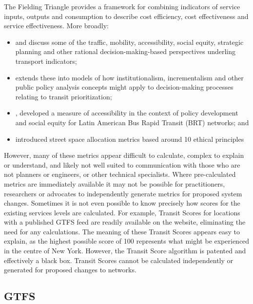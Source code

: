\documentclass[preprint, 3p,
authoryear]{elsarticle} %
\begin{document}
The Fielding Triangle \citep{FieldingGordonJ1987Mpts} provides a
framework for combining indicators of service inputs, outputs and
consumption to describe cost efficiency, cost effectiveness and service
effectiveness. More broadly:

\begin{itemize}
\item
  \citet{Litman:2003ab} and \citet{Litman:2016aa} discuss some of the
  traffic, mobility, accessibility, social equity, strategic planning
  and other rational decision-making-based perspectives underling
  transport indicators;
\item
  \citet{Reynolds:2017ah} extends these into models of how
  institutionalism, incrementalism and other public policy analysis
  concepts might apply to decision-making processes relating to transit
  prioritization;
\item
  \citet{GuzmanLuisA.2017Aeit}, developed a measure of accessibility in
  the context of policy development and social equity for Latin American
  Bus Rapid Transit (BRT) networks; and
\item
  \citet{Creutzig2020streetspaceallocation} introduced street space
  allocation metrics based around 10 ethical principles
\end{itemize}

However, many of these metrics appear difficult to calculate, complex to
explain or understand, and likely not well suited to communication with
those who are not planners or engineers, or other technical specialists.
Where pre-calculated metrics are immediately available it may not be
possible for practitioners, researchers or advocates to independently
generate metrics for proposed system changes. Sometimes it is not even
possible to know precisely how scores for the existing services levels
are calculated. For example, Transit Scores for locations with a
published GTFS feed are readily available on the
\citet{WalkScore:2023tg} website, eliminating the need for any
calculations. The meaning of these Transit Scores appears easy to
explain, as the highest possible score of 100 represents what might be
experienced in the centre of New York. However, the Transit Score
algorithm is patented and effectively a black box. Transit Scores cannot
be calculated independently or generated for proposed changes to
networks.

\hypertarget{gtfs}{%
\subsection{GTFS}\label{gtfs}}
\end{document}
